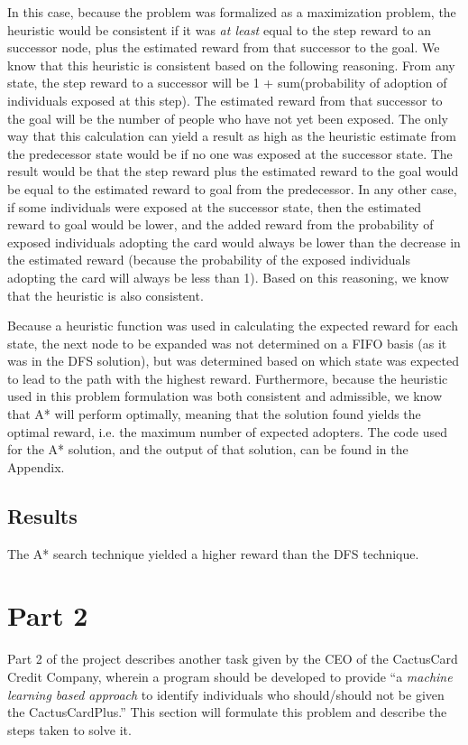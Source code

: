 \documentclass[11pt,journal]{IEEEtran}
\begin{document}
In this case, because the problem was formalized as a maximization problem, the heuristic would be consistent if it was \textit{at least} equal to the step reward to an successor node, plus the estimated reward from that successor to the goal. We know that this heuristic is consistent based on the following reasoning. From any state, the step reward to a successor will be 1 + sum(probability of adoption of individuals exposed at this step). The estimated reward from that successor to the goal will be the number of people who have not yet been exposed. The only way that this calculation can yield a result as high as the heuristic estimate from the predecessor state would be if no one was exposed at the successor state. The result would be that the step reward plus the estimated reward to the goal would be equal to the estimated reward to goal from the predecessor. In any other case, if some individuals were exposed at the successor state, then the estimated reward to goal would be lower, and the added reward from the probability of exposed individuals adopting the card would always be lower than the decrease in the estimated reward (because the probability of the exposed individuals adopting the card will always be less than 1). Based on this reasoning, we know that the heuristic is also consistent.

Because a heuristic function was used in calculating the expected reward for each state, the next node to be expanded was not determined on a FIFO basis (as it was in the DFS solution), but was determined based on which state was expected to lead to the path with the highest reward. Furthermore, because the heuristic used in this problem formulation was both consistent and admissible, we know that A* will perform optimally, meaning that the solution found yields the optimal reward, i.e. the maximum number of expected adopters. The code used for the A* solution, and the output of that solution, can be found in the Appendix.

\subsection{Results}
The A* search technique yielded a higher reward than the DFS technique.

\section{Part 2} \label{part2}
Part 2 of the project describes another task given by the CEO of the CactusCard Credit Company, wherein a program should be developed to provide ``a \emph{machine learning based approach} to identify individuals who should/should not be given the CactusCardPlus.'' This section will formulate this problem and describe the steps taken to solve it.
\end{document}
